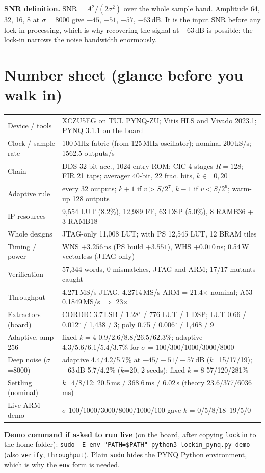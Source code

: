 \documentclass[10pt,a4paper]{article}
\renewcommand{\c}[1]{\texttt{#1}}
\begin{document}
\textbf{SNR definition.} $\mathrm{SNR}=A^2/(2\sigma^2)$ over the whole sample band. Amplitude 64, 32, 16, 8 at $\sigma=8000$ give $-45$, $-51$, $-57$, $-63$\,dB. It is the input SNR before any lock-in processing, which is why recovering the signal at $-63$\,dB is possible: the lock-in narrows the noise bandwidth enormously.

\section{Number sheet (glance before you walk in)}
\begin{center}\footnotesize
\begin{tabularx}{\linewidth}{@{}lX@{}}\toprule
Device / tools & XCZU5EG on TUL PYNQ-ZU; Vitis HLS and Vivado 2023.1; PYNQ 3.1.1 on the board \\
Clock / sample rate & 100\,MHz fabric (from 125\,MHz oscillator); nominal 200\,kS/s; 1562.5 outputs/s \\
Chain & DDS 32-bit acc., 1024-entry ROM; CIC 4 stages $R=128$; FIR 21 taps; averager 40-bit, 22 frac. bits, $k\in[0,20]$ \\
Adaptive rule & every 32 outputs; $k{+}1$ if $v>S/2^7$, $k{-}1$ if $v<S/2^9$; warm-up 128 outputs \\
IP resources & 9,554 LUT (8.2\%), 12,989 FF, 63 DSP (5.0\%), 8 RAMB36 + 3 RAMB18 \\
Whole designs & JTAG-only 11,008 LUT; with PS 12,545 LUT, 12 BRAM tiles \\
Timing / power & WNS $+3.256$\,ns (PS build $+3.551$), WHS $+0.010$\,ns; 0.54\,W vectorless (JTAG-only) \\
Verification & 57,344 words, 0 mismatches, JTAG and ARM; 17/17 mutants caught \\
Throughput & 4.271\,MS/s JTAG, 4.2714\,MS/s ARM = 21.4$\times$ nominal; A53 0.1849\,MS/s $\Rightarrow$ 23$\times$ \\
Extractors (board) & CORDIC 3.7\,LSB / 1.28$^\circ$ / 776 LUT / 1 DSP; LUT 0.66 / 0.012$^\circ$ / 1,438 / 3; poly 0.75 / 0.006$^\circ$ / 1,468 / 9 \\
Adaptive, amp 256 & fixed $k{=}4$ 0.9/2.6/8.8/26.5/62.3\%; adaptive 4.3/5.6/6.1/5.4/3.7\% for $\sigma$ = 100/300/1000/3000/8000 \\
Deep noise ($\sigma$=8000) & adaptive 4.4/4.2/5.7\% at $-45/-51/-57$\,dB ($k$=15/17/19); $-63$\,dB 5.7/4.2\% ($k$=20, 2 seeds); fixed $k{=}8$ 57/120/281\% \\
Settling (nominal) & $k$=4/8/12: 20.5\,ms / 368.6\,ms / 6.02\,s (theory 23.6/377/6036\,ms) \\
Live ARM demo & $\sigma$ 100/1000/3000/8000/1000/100 gave $k$ = 0/5/8/18--19/5/0 \\ \bottomrule
\end{tabularx}
\end{center}
\textbf{Demo command if asked to run live} (on the board, after copying \c{lockin} to the home folder): \c{sudo -E env "PATH=\$PATH" python3 lockin\_pynq.py demo} (also \c{verify}, \c{throughput}). Plain \c{sudo} hides the PYNQ Python environment, which is why the \c{env} form is needed.
\end{document}
